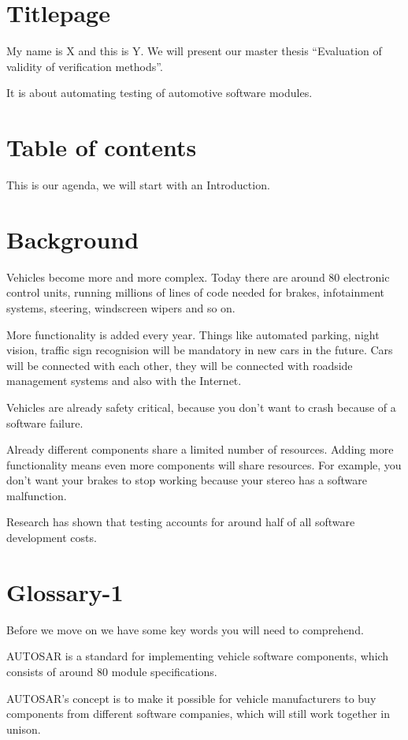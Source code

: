 \documentclass[a4paper]{article}
\begin{document}
\section{Titlepage}
My name is X and this is Y. We will present our master thesis
``Evaluation of validity of verification methods''.

It is about automating testing of automotive software modules.

\section{Table of contents}
This is our agenda, we will start with an Introduction.

\section{Background}
Vehicles become more and more complex. Today there are around 80
electronic control units, running millions of lines of code needed for
brakes, infotainment systems, steering, windscreen wipers and so on.

More functionality is added every year. Things like automated parking,
night vision, traffic sign recognision will be mandatory in new cars
in the future. Cars will be connected with each other, they will be
connected with roadside management systems and also with the Internet.

Vehicles are already safety critical, because you don't want to crash
because of a software failure.

Already different components share a limited number of
resources. Adding more functionality means even more components will
share resources. For example, you don't want your brakes to stop
working because your stereo has a software malfunction.

Research has shown that testing accounts for around half of all
software development costs.

\section{Glossary-1}
Before we move on we have some key words you will need to comprehend.

AUTOSAR is a standard for implementing vehicle software components,
which consists of around 80 module specifications.

AUTOSAR's concept is to make it possible for vehicle manufacturers to
buy components from different software companies, which will still
work together in unison.
\end{document}
